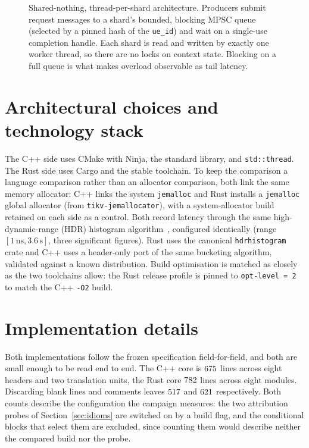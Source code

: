 \documentclass[english,twoside,openright,a4paper,censored,csm,software-track-2020]{HYthesisML}
\begin{document}
\begin{figure}[ht]
\caption[Shared-nothing, thread-per-shard architecture]{Shared-nothing, thread-per-shard architecture. Producers submit request messages to a
shard's bounded, blocking MPSC queue (selected by a pinned hash of the \texttt{ue\_id}) and wait
on a single-use completion handle. Each shard is read and written by exactly one worker thread,
so there are no locks on context state. Blocking on a full queue is what makes overload
observable as tail latency.\label{fig:arch}}
\end{figure}

\section{Architectural choices and technology stack}
The C++ side uses CMake with Ninja, the standard library, and \texttt{std::thread}. The Rust
side uses Cargo and the stable toolchain. To keep the comparison a language comparison
rather than an allocator comparison, both link the same memory allocator: C++ links the
system \texttt{jemalloc} and Rust installs a \texttt{jemalloc} global allocator (from
\texttt{tikv-jemallocator}), with a system-allocator build retained on each side as a
control. Both record latency through the same high-dynamic-range (HDR) histogram
algorithm~\cite{tene_hdrhistogram}, configured identically (range $[1\,\text{ns},
3.6\,\text{s}]$, three significant figures). Rust uses the canonical \texttt{hdrhistogram}
crate and C++ uses a header-only port of the same bucketing algorithm, validated against a
known distribution. Build optimisation is matched as closely as the two toolchains allow:
the Rust release profile is pinned to \texttt{opt-level~=~2} to match the C++ \texttt{-O2}
build.

\section{Implementation details}\label{sec:impldetails}
\label{sec:impl}
Both implementations follow the frozen specification field-for-field, and both are small
enough to be read end to end. The C++ core is $675$ lines across eight headers and two
translation units, the Rust core $782$ lines across eight modules. Discarding blank
lines and comments leaves $517$ and $621$ respectively. Both counts describe the
configuration the campaign measures: the two attribution probes of Section~\ref{sec:idioms} are
switched on by a build flag, and the conditional blocks that select them are excluded, since
counting them would describe neither the compared build nor the probe.
\end{document}
